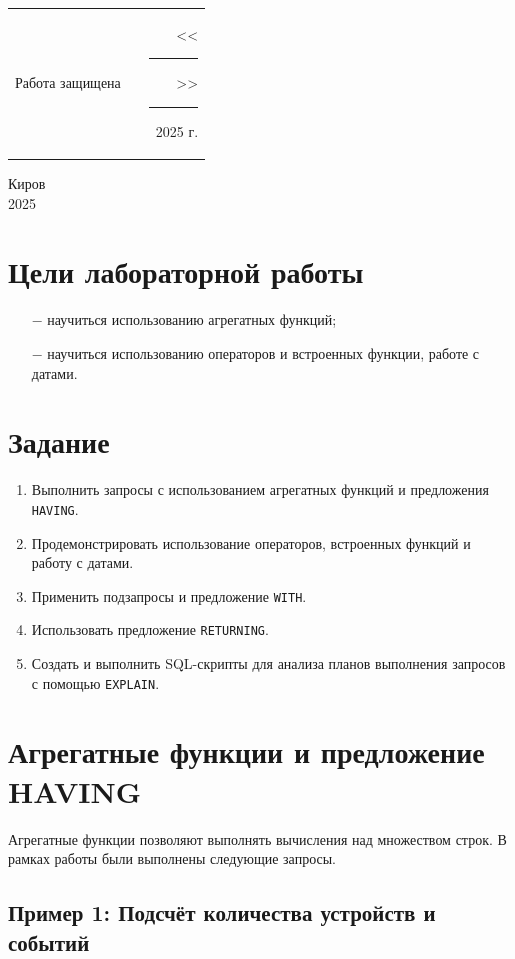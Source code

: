 \documentclass[oneside,a4paper,14pt]{extarticle}
\begin{document}
\noindent
\begin{tabular}{lp{58mm}r}
  Работа защищена &  & \hspace{13mm}<<\rule[-1mm]{5mm}{0.10mm}\/>>\rule[-1mm]{30mm}{0.10mm}\ 2025 г.
\end{tabular}
\vfill

\begin{center}
  Киров\\
  2025
\end{center}

\newpage\thispagestyle{plain}

\section*{Цели лабораторной работы}
\begin{itemize}
  \item[$-$] научиться использованию агрегатных функций;
  \item[$-$] научиться использованию операторов и встроенных функции, работе с датами.
\end{itemize}


\section*{Задание}
\begin{enumerate}
  \item Выполнить запросы с использованием агрегатных функций и предложения \texttt{HAVING}.
  \item Продемонстрировать использование операторов, встроенных функций и работу с датами.
  \item Применить подзапросы и предложение \texttt{WITH}.
  \item Использовать предложение \texttt{RETURNING}.
  \item Создать и выполнить SQL-скрипты для анализа планов выполнения запросов с помощью \texttt{EXPLAIN}.
\end{enumerate}

\clearpage
\section*{Агрегатные функции и предложение HAVING}

Агрегатные функции позволяют выполнять вычисления над множеством строк. В рамках работы были выполнены следующие запросы.

\subsection*{Пример 1: Подсчёт количества устройств и событий}
\end{document}
